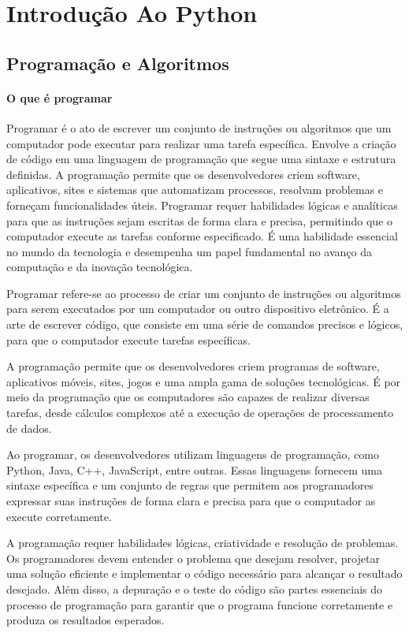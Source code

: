 \documentclass[a4paper, 12pt, onecolumn,singlespacing]{article}
\begin{document}
	\section{Introdução Ao Python}
	
	\subsection{Programação e Algoritmos}
	
	\paragraph{O que é programar} Programar é o ato de escrever um conjunto de instruções ou algoritmos que um computador pode executar para realizar uma tarefa específica. Envolve a criação de código em uma linguagem de programação que segue uma sintaxe e estrutura definidas. A programação permite que os desenvolvedores criem software, aplicativos, sites e sistemas que automatizam processos, resolvam problemas e forneçam funcionalidades úteis. Programar requer habilidades lógicas e analíticas para que as instruções sejam escritas de forma clara e precisa, permitindo que o computador execute as tarefas conforme especificado. É uma habilidade essencial no mundo da tecnologia e desempenha um papel fundamental no avanço da computação e da inovação tecnológica.
	
	Programar refere-se ao processo de criar um conjunto de instruções ou algoritmos para serem executados por um computador ou outro dispositivo eletrônico. É a arte de escrever código, que consiste em uma série de comandos precisos e lógicos, para que o computador execute tarefas específicas.
	
	A programação permite que os desenvolvedores criem programas de software, aplicativos móveis, sites, jogos e uma ampla gama de soluções tecnológicas. É por meio da programação que os computadores são capazes de realizar diversas tarefas, desde cálculos complexos até a execução de operações de processamento de dados.
	
	Ao programar, os desenvolvedores utilizam linguagens de programação, como Python, Java, C++, JavaScript, entre outras. Essas linguagens fornecem uma sintaxe específica e um conjunto de regras que permitem aos programadores expressar suas instruções de forma clara e precisa para que o computador as execute corretamente.
	
	A programação requer habilidades lógicas, criatividade e resolução de problemas. Os programadores devem entender o problema que desejam resolver, projetar uma solução eficiente e implementar o código necessário para alcançar o resultado desejado. Além disso, a depuração e o teste do código são partes essenciais do processo de programação para garantir que o programa funcione corretamente e produza os resultados esperados.
	
\end{document}
